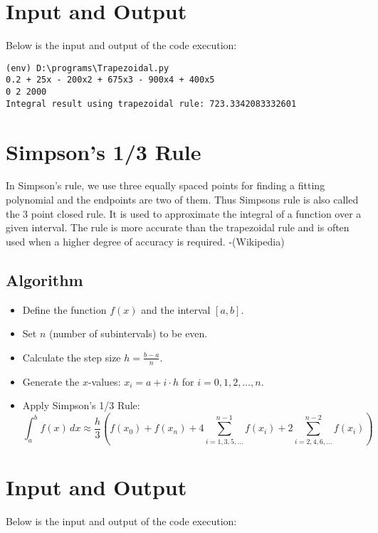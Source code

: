 \documentclass[12pt]{article}
\begin{document}
            \section*{Input and Output}
            \noindent Below is the input and output of the code execution:

            {\small
            \begin{verbatim}
(env) D:\programs\Trapezoidal.py
0.2 + 25x - 200x2 + 675x3 - 900x4 + 400x5
0 2 2000   
Integral result using trapezoidal rule: 723.3342083332601
            \end{verbatim}
            }


\section*{Simpson's 1/3 Rule}

In Simpson's rule, we use three equally spaced points for finding a fitting polynomial and the endpoints are two of them. Thus Simpsons rule is also called the 3 point closed rule. It is used to approximate the integral of a function over a given interval. The rule is more accurate than the trapezoidal rule and is often used when a higher degree of accuracy is required. -(Wikipedia)
\subsection*{Algorithm}
\begin{itemize}
    \item Define the function \( f(x) \) and the interval \([a, b]\).
    \item Set \( n \) (number of subintervals) to be even.
    \item Calculate the step size \( h = \frac{b - a}{n} \).
    \item Generate the \( x \)-values: \( x_i = a + i \cdot h \) for \( i = 0, 1, 2, \ldots, n \).
    \item Apply Simpson's 1/3 Rule:
    \[
    \int_a^b f(x) \, dx \approx \frac{h}{3} \left( f(x_0) + f(x_n) + 4 \sum_{i=1,3,5,\ldots}^{n-1} f(x_i) + 2 \sum_{i=2,4,6,\ldots}^{n-2} f(x_i) \right)
    \]
\end{itemize}

\section*{Input and Output}
\noindent Below is the input and output of the code execution:
            
\end{document}
